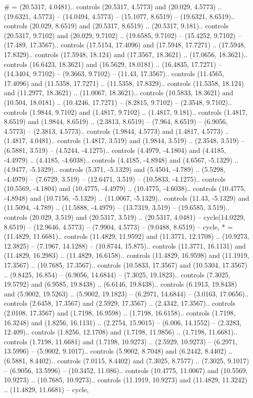 {\#} = {(20.5317, 4.0481).. controls (20.5317, 4.5773) and (20.029, 4.5773) .. (19.6321, 4.5773) -- (14.0494, 4.5773) -- (15.1077, 8.6519) -- (19.6321, 8.6519).. controls (20.029, 8.6519) and (20.5317, 8.6519) .. (20.5317, 9.181).. controls (20.5317, 9.7102) and (20.029, 9.7102) .. (19.6585, 9.7102) -- (15.4252, 9.7102) -- (17.489, 17.3567).. controls (17.5154, 17.4096) and (17.5948, 17.7271) .. (17.5948, 17.8329).. controls (17.5948, 18.124) and (17.3567, 18.3621) .. (17.0656, 18.3621).. controls (16.6423, 18.3621) and (16.5629, 18.0181) .. (16.4835, 17.7271) -- (14.3404, 9.7102) -- (9.3663, 9.7102) -- (11.43, 17.3567).. controls (11.4565, 17.4096) and (11.5358, 17.7271) .. (11.5358, 17.8329).. controls (11.5358, 18.124) and (11.2977, 18.3621) .. (11.0067, 18.3621).. controls (10.5833, 18.3621) and (10.504, 18.0181) .. (10.4246, 17.7271) -- (8.2815, 9.7102) -- (2.3548, 9.7102).. controls (1.9844, 9.7102) and (1.4817, 9.7102) .. (1.4817, 9.181).. controls (1.4817, 8.6519) and (1.9844, 8.6519) .. (2.3813, 8.6519) -- (7.964, 8.6519) -- (6.9056, 4.5773) -- (2.3813, 4.5773).. controls (1.9844, 4.5773) and (1.4817, 4.5773) .. (1.4817, 4.0481).. controls (1.4817, 3.519) and (1.9844, 3.519) .. (2.3548, 3.519) -- (6.5881, 3.519) -- (4.5244, -4.1275).. controls (4.4979, -4.1804) and (4.4185, -4.4979) .. (4.4185, -4.6038).. controls (4.4185, -4.8948) and (4.6567, -5.1329) .. (4.9477, -5.1329).. controls (5.371, -5.1329) and (5.4504, -4.789) .. (5.5298, -4.4979) -- (7.6729, 3.519) -- (12.6471, 3.519) -- (10.5833, -4.1275).. controls (10.5569, -4.1804) and (10.4775, -4.4979) .. (10.4775, -4.6038).. controls (10.4775, -4.8948) and (10.7156, -5.1329) .. (11.0067, -5.1329).. controls (11.43, -5.1329) and (11.5094, -4.789) .. (11.5888, -4.4979) -- (13.7319, 3.519) -- (19.6585, 3.519).. controls (20.029, 3.519) and (20.5317, 3.519) .. (20.5317, 4.0481) -- cycle(14.0229, 8.6519) -- (12.9646, 4.5773) -- (7.9904, 4.5773) -- (9.0488, 8.6519) -- cycle},
{*} = {(11.4829, 11.6681).. controls (11.4829, 11.9592) and (11.3771, 12.1708) .. (10.9273, 12.3825) -- (7.1967, 14.1288) -- (10.8744, 15.875).. controls (11.3771, 16.1131) and (11.4829, 16.2983) .. (11.4829, 16.6158).. controls (11.4829, 16.9598) and (11.1919, 17.3567) .. (10.7685, 17.3567).. controls (10.5833, 17.3567) and (10.5304, 17.3567) .. (9.8425, 16.854) -- (6.9056, 14.6844) -- (7.3025, 19.1823).. controls (7.3025, 19.5792) and (6.9585, 19.8438) .. (6.6146, 19.8438).. controls (6.1913, 19.8438) and (5.9002, 19.5263) .. (5.9002, 19.1823) -- (6.2971, 14.6844) -- (3.0163, 17.0656).. controls (2.6458, 17.3567) and (2.5929, 17.3567) .. (2.4342, 17.3567).. controls (2.0108, 17.3567) and (1.7198, 16.9598) .. (1.7198, 16.6158).. controls (1.7198, 16.3248) and (1.8256, 16.1131) .. (2.2754, 15.9015) -- (6.006, 14.1552) -- (2.3283, 12.409).. controls (1.8256, 12.1708) and (1.7198, 11.9856) .. (1.7198, 11.6681).. controls (1.7198, 11.6681) and (1.7198, 10.9273) .. (2.5929, 10.9273) -- (6.2971, 13.5996) -- (5.9002, 9.1017).. controls (5.9002, 8.7048) and (6.2442, 8.4402) .. (6.5881, 8.4402).. controls (7.0115, 8.4402) and (7.3025, 8.7577) .. (7.3025, 9.1017) -- (6.9056, 13.5996) -- (10.3452, 11.086).. controls (10.4775, 11.0067) and (10.5569, 10.9273) .. (10.7685, 10.9273).. controls (11.1919, 10.9273) and (11.4829, 11.3242) .. (11.4829, 11.6681) -- cycle},
